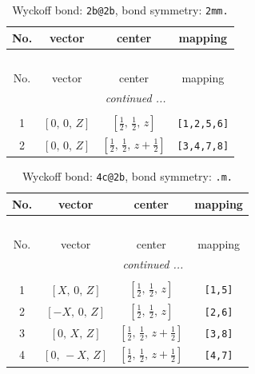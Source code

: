 \documentclass[fleqn,8pt]{jsarticle}
\begin{document}
\renewcommand{\arraystretch}{1.2}
\begin{longtable}{cccc}
\caption{Wyckoff bond: {\tt 2b@2b}, bond symmetry: {\tt 2mm.}}
 \\
 \hline \hline
No. & vector & center & mapping \\ \hline \endfirsthead

\multicolumn{3}{l}{\tablename\ \thetable{}} \\
 \hline \hline
No. & vector & center & mapping \\ \hline \endhead

 \hline \hline
\multicolumn{3}{r}{\footnotesize\it continued ...} \\ \endfoot

 \hline \hline
\multicolumn{3}{r}{} \\ \endlastfoot

1 & $\left[ 0,\, 0,\, Z \right]$ & $\left[ \frac{1}{2},\, \frac{1}{2},\, z \right]$ & {\tt [1,2,5,6]} \\ \hline
2 & $\left[ 0,\, 0,\, Z \right]$ & $\left[ \frac{1}{2},\, \frac{1}{2},\, z + \frac{1}{2} \right]$ & {\tt [3,4,7,8]} \\
\end{longtable}
\renewcommand{\arraystretch}{1.2}
\begin{longtable}{cccc}
\caption{Wyckoff bond: {\tt 4c@2b}, bond symmetry: {\tt .m.}}
 \\
 \hline \hline
No. & vector & center & mapping \\ \hline \endfirsthead

\multicolumn{3}{l}{\tablename\ \thetable{}} \\
 \hline \hline
No. & vector & center & mapping \\ \hline \endhead

 \hline \hline
\multicolumn{3}{r}{\footnotesize\it continued ...} \\ \endfoot

 \hline \hline
\multicolumn{3}{r}{} \\ \endlastfoot

1 & $\left[ X,\, 0,\, Z \right]$ & $\left[ \frac{1}{2},\, \frac{1}{2},\, z \right]$ & {\tt [1,5]} \\ \hline
2 & $\left[ - X,\, 0,\, Z \right]$ & $\left[ \frac{1}{2},\, \frac{1}{2},\, z \right]$ & {\tt [2,6]} \\ \hline
3 & $\left[ 0,\, X,\, Z \right]$ & $\left[ \frac{1}{2},\, \frac{1}{2},\, z + \frac{1}{2} \right]$ & {\tt [3,8]} \\ \hline
4 & $\left[ 0,\, - X,\, Z \right]$ & $\left[ \frac{1}{2},\, \frac{1}{2},\, z + \frac{1}{2} \right]$ & {\tt [4,7]} \\
\end{longtable}
\end{document}
